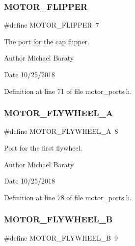 \subsubsection{M\+O\+T\+O\+R\+\_\+\+F\+L\+I\+P\+P\+ER}
{\footnotesize\ttfamily \#define M\+O\+T\+O\+R\+\_\+\+F\+L\+I\+P\+P\+ER~7}



The port for the cap flipper. 

\begin{DoxyAuthor}{Author}
Michael Baraty 
\end{DoxyAuthor}
\begin{DoxyDate}{Date}
10/25/2018 
\end{DoxyDate}


Definition at line 71 of file motor\+\_\+ports.\+h.

\mbox{\label{motor__ports_8h_a2ab748678c046dca3c279ad60974b73d}} 
\subsubsection{M\+O\+T\+O\+R\+\_\+\+F\+L\+Y\+W\+H\+E\+E\+L\+\_\+A}
{\footnotesize\ttfamily \#define M\+O\+T\+O\+R\+\_\+\+F\+L\+Y\+W\+H\+E\+E\+L\+\_\+A~8}



Port for the first flywheel. 

\begin{DoxyAuthor}{Author}
Michael Baraty 
\end{DoxyAuthor}
\begin{DoxyDate}{Date}
10/25/2018 
\end{DoxyDate}


Definition at line 78 of file motor\+\_\+ports.\+h.

\mbox{\label{motor__ports_8h_afb09e0b75a1fa01301813b19ab267914}} 
\subsubsection{M\+O\+T\+O\+R\+\_\+\+F\+L\+Y\+W\+H\+E\+E\+L\+\_\+B}
{\footnotesize\ttfamily \#define M\+O\+T\+O\+R\+\_\+\+F\+L\+Y\+W\+H\+E\+E\+L\+\_\+B~9}



